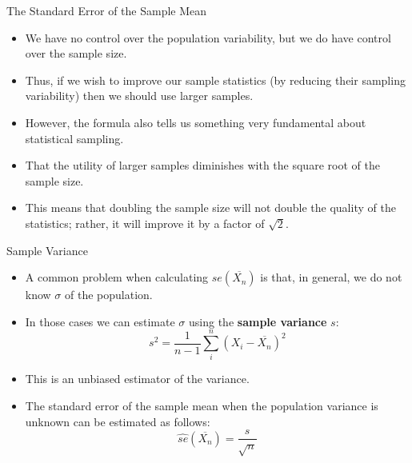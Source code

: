 \documentclass[handout]{beamer}
\begin{document}
\begin{frame}{The Standard Error of the Sample Mean}
\scriptsize{

\begin{itemize}
\item We have no control over the population variability, but we do have control over the sample size. 
\item Thus, if we wish to improve our sample statistics (by reducing their sampling variability) then we should use larger samples.
\item However, the formula also tells us something very fundamental about statistical sampling.
\item That the utility of larger samples diminishes with the square root of the sample size. 
\item This means that doubling the sample size will not double the quality of the statistics; rather, it will improve it by a factor of $\sqrt{2}$. \cite{poldrack2019statistical}


\end{itemize}


} 
\end{frame}



\begin{frame}{Sample Variance}
\scriptsize{
\begin{itemize}
 \item A common problem when calculating $ se(\overline{X_{n}})$ is that, in general, we do not know $\sigma$ of the population.
 \item In those cases we can estimate $\sigma$ using the \textbf{sample variance} $s$:
\begin{displaymath}
 s^{2}= \frac{1}{n-1} \sum_{i}^{n}(X_{i}-\overline{X_{n}})^2
\end{displaymath}

\item This is an unbiased estimator of the variance.

\item The standard error of the sample mean when the population variance is unknown can be estimated as follows:
\begin{displaymath}                                                                                                                 
\hat{se}(\overline{X_{n}}) = \frac{s}{\sqrt{n}}                                                                                                                \end{displaymath}


\end{itemize}


} 
\end{frame}
\end{document}
